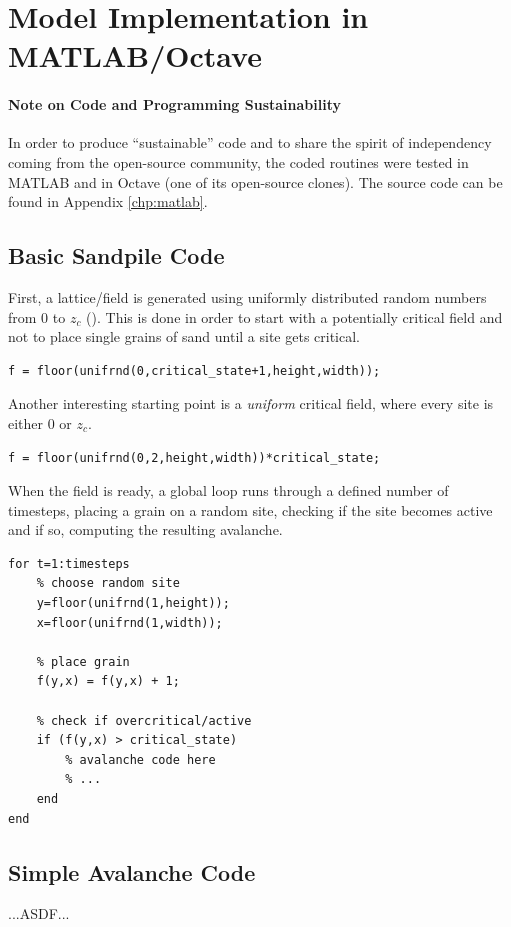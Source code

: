 \chapter{Model Implementation in MATLAB/Octave}
\thispagestyle{fancy}

\subsubsection{Note on Code and Programming Sustainability}
In order to produce  ``sustainable'' code and to share the spirit of independency coming from the open-source community, the coded routines were tested in MATLAB and in Octave (one of its open-source clones). The source code can be found in Appendix \ref{chp:matlab}.

\section{Basic Sandpile Code}
First, a lattice/field is generated using uniformly distributed random numbers from 0 to $z_c$ (). This is done in order to start with a potentially critical field and not to place single grains of sand until a site gets critical.
\begin{lstlisting}
f = floor(unifrnd(0,critical_state+1,height,width));
\end{lstlisting}
Another interesting starting point is a \emph{uniform} critical field, where every site is either 0 or $z_c$.
\begin{lstlisting}
f = floor(unifrnd(0,2,height,width))*critical_state;
\end{lstlisting}

When the field is ready, a global loop runs through a defined number of timesteps, placing a grain on a random site, checking if the site becomes active and if so, computing the resulting avalanche.
\begin{lstlisting}
for t=1:timesteps
	% choose random site
	y=floor(unifrnd(1,height));
	x=floor(unifrnd(1,width));

	% place grain
	f(y,x) = f(y,x) + 1;

	% check if overcritical/active
	if (f(y,x) > critical_state)
		% avalanche code here
		% ...
	end
end
\end{lstlisting}

\section{Simple Avalanche Code}
...ASDF...

